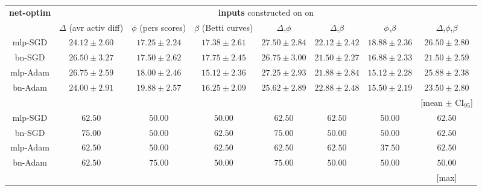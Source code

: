 

\begin{table}[h!]
    \centering
\footnotesize
\begin{tabular}{cccccccc}
    \toprule
    \textbf{net-optim} & \multicolumn{7}{c}{\textbf{inputs} constructed on on} \\ \cmidrule{2-8}
    {} & $\Delta$ (avr activ diff) & $\phi$ (pers scores) & $\beta$ (Betti curves) & $\Delta$,$\phi$ & $\Delta$,$\beta$ & $\phi$,$\beta$ &   $\Delta$,$\phi$,$\beta$ \\
    \hline
        mlp-SGD    &           $24.12 \pm 2.60$ &           $17.25 \pm 2.24$ &           $17.38 \pm 2.61$ &  $\mathbf{27.50 \pm 2.84}$ &           $22.12 \pm 2.42$ &  $\mathbf{18.88 \pm 2.36}$ &  $\mathbf{26.50 \pm 2.80}$ \\
        bn-SGD  &           $26.50 \pm 3.27$ &           $17.50 \pm 2.62$ &  $\mathbf{17.75 \pm 2.45}$ &           $26.75 \pm 3.00$ &           $21.50 \pm 2.27$ &           $16.88 \pm 2.33$ &           $21.50 \pm 2.59$ \\
        mlp-Adam   &  $\mathbf{26.75 \pm 2.59}$ &           $18.00 \pm 2.46$ &           $15.12 \pm 2.36$ &           $27.25 \pm 2.93$ &           $21.88 \pm 2.84$ &           $15.12 \pm 2.28$ &           $25.88 \pm 2.38$ \\
        bn-Adam &           $24.00 \pm 2.91$ &  $\mathbf{19.88 \pm 2.57}$ &           $16.25 \pm 2.09$ &           $25.62 \pm 2.89$ &  $\mathbf{22.88 \pm 2.48}$ &           $15.50 \pm 2.19$ &           $23.50 \pm 2.80$ \\
        & & & & & & & [mean $\pm$ CI$_{95}$] \\
    \hline
        mlp-SGD    &           $62.50$ &           $50.00$ &           $50.00$ &           $62.50$ &  $\mathbf{62.50}$ &   $\mathbf{50.00}$ &         $\mathbf{62.50}$ \\
        bn-SGD  &  $\mathbf{75.00}$ &           $50.00$ &  $\mathbf{62.50}$ &  $\mathbf{75.00}$ &           $50.00$ &            $50.00$ &                  $62.50$ \\
        mlp-Adam   &           $62.50$ &           $50.00$ &           $62.50$ &           $62.50$ &           $62.50$ &            $37.50$ &                  $62.50$ \\
        bn-Adam &           $62.50$ &  $\mathbf{75.00}$ &           $50.00$ &           $75.00$ &           $50.00$ &            $50.00$ &                  $50.00$ \\
        & & & & & & & [max] \\

\end{tabular}
\end{table}
